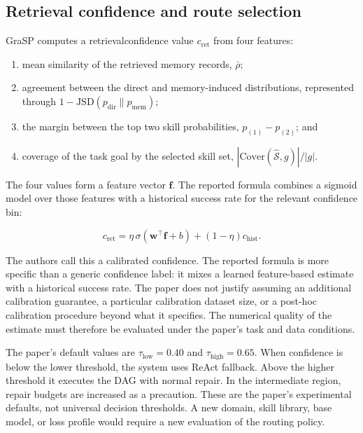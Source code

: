 \subsection{Retrieval confidence and route selection}

GraSP computes a \gls{retrievalconfidence} value \(c_{\mathrm{ret}}\) from four features:

\begin{enumerate}
  \item mean similarity of the retrieved memory records, \(\bar{\rho}\);
  \item agreement between the direct and memory-induced distributions, represented through \(1-\mathrm{JSD}(p_{\mathrm{dir}}\|p_{\mathrm{mem}})\);
  \item the margin between the top two skill probabilities, \(p_{(1)}-p_{(2)}\); and
  \item coverage of the task goal by the selected skill set, \(|\mathrm{Cover}(\hat{\mathcal{S}},g)|/|g|\).
\end{enumerate}

The four values form a feature vector \(\mathbf f\). The reported formula combines a sigmoid model over those features with a historical success rate for the relevant confidence bin:

\[
 c_{\mathrm{ret}}=\eta\,\sigma(\mathbf w^{\top}\mathbf f+b)
 +(1-\eta)c_{\mathrm{hist}}.
\]

The authors call this a calibrated confidence. The reported formula is more specific than a generic confidence label: it mixes a learned feature-based estimate with a historical success rate. The paper does not justify assuming an additional calibration guarantee, a particular calibration dataset size, or a post-hoc calibration procedure beyond what it specifies. The numerical quality of the estimate must therefore be evaluated under the paper's task and data conditions.\autocite{xia2026grasp}


The paper's default values are \(\tau_{\mathrm{low}}=0.40\) and \(\tau_{\mathrm{high}}=0.65\). When confidence is below the lower threshold, the system uses ReAct fallback. Above the higher threshold it executes the DAG with normal repair. In the intermediate region, repair budgets are increased as a precaution. These are the paper's experimental defaults, not universal decision thresholds. A new domain, skill library, base model, or loss profile would require a new evaluation of the routing policy.\autocite{xia2026grasp}

